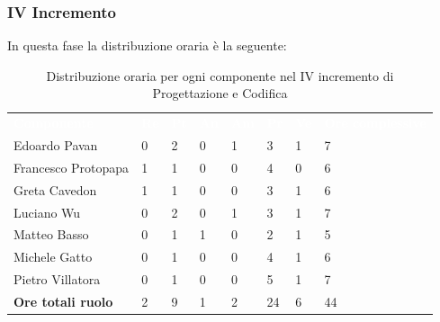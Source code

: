 \subsubsection{IV Incremento}
In questa fase la distribuzione oraria è la seguente:
\begin{table}[H]
\begin{center}
\renewcommand{\arraystretch}{1.25}
\begin{tabular}{ m{}<{\centering}  m{}<{\centering} m{}<{\centering} m{}<{\centering}  m{}<{\centering}  m{}<{\centering}  m{}<{\centering}  m{}<{\centering}   }
	\rowcolor{darkblue}
	\textcolor{white}{\textbf{Componente}} &\textcolor{white}{\textbf{Re}}&\textcolor{white}{\textbf{Pt}}&\textcolor{white}{\textbf{An}}&\textcolor{white}{\textbf{Am}}&\textcolor{white}{\textbf{Pr}}&\textcolor{white}{\textbf{Ve}}&\textcolor{white}{\textbf{Ore complessive}}\\ 
	Edoardo Pavan & 0 & 2 & 0 & 1 & 3 & 1 & 7 \\	
	
	Francesco Protopapa & 1 & 1 & 0 & 0 & 4 & 0 & 6 \\

	Greta Cavedon & 1 & 1 & 0 & 0 & 3 & 1 & 6 \\
	
	Luciano Wu & 0 & 2 & 0 & 1 & 3 & 1 & 7 \\
	
	Matteo Basso & 0 & 1 & 1 & 0 & 2 & 1 & 5 \\
	
	Michele Gatto & 0 & 1 & 0 & 0 & 4 & 1 & 6 \\
	
	Pietro Villatora & 0 & 1 & 0 & 0 & 5 & 1 & 7 \\
	
	\textbf{Ore totali ruolo} & 2 & 9 & 1 & 2 & 24 & 6 & 44 \\

\end{tabular}
\caption{Distribuzione oraria per ogni componente nel IV incremento di Progettazione e Codifica}
\end{center}
\end{table}

